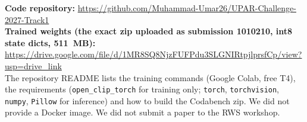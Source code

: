 \documentclass[a4paper, 10pt, conference]{ieeeconf}
\begin{document}
\textbf{Code repository:} \url{https://github.com/Muhammad-Umar26/UPAR-Challenge-2027-Track1} \\
\textbf{Trained weights (the exact zip uploaded as submission 1010210, int8 state dicts, 511~MB):} \url{https://drive.google.com/file/d/1MR8SQ8NjzFUFPdu3SLGNIRtpjlprsfCp/view?usp=drive_link} \\
The repository README lists the training commands (Google Colab, free T4), the requirements (\texttt{open\_clip\_torch} for training only; \texttt{torch}, \texttt{torchvision}, \texttt{numpy}, \texttt{Pillow} for inference) and how to build the Codabench zip. We did not provide a Docker image.
We did not submit a paper to the RWS workshop.






\end{document}
